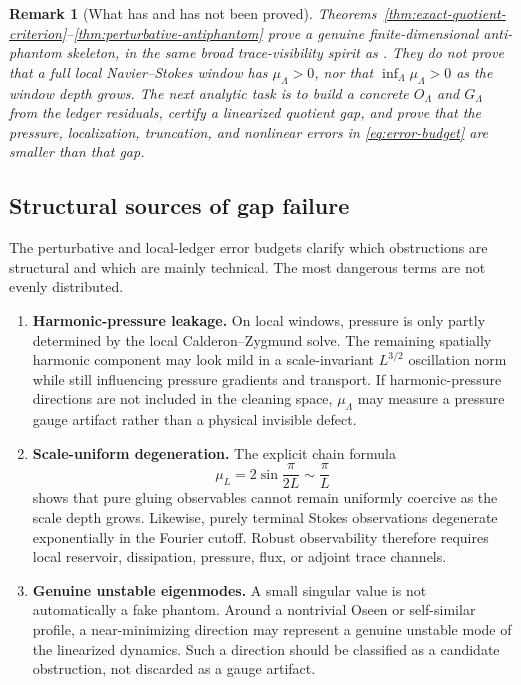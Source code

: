 \documentclass[11pt]{article}
\numberwithin{equation}{section}
\newtheorem{remark}[theorem]{Remark}
\begin{document}
\begin{remark}[What has and has not been proved]
Theorems~\ref{thm:exact-quotient-criterion}--\ref{thm:perturbative-antiphantom} prove a genuine finite-dimensional anti-phantom skeleton, in the same broad trace-visibility spirit as \cite{Yu2026SchurVisibility}.  They do not prove that a full local Navier--Stokes window has $\mu_\Lambda>0$, nor that $\inf_\Lambda\mu_\Lambda>0$ as the window depth grows.  The next analytic task is to build a concrete $O_\Lambda$ and $G_\Lambda$ from the ledger residuals, certify a linearized quotient gap, and prove that the pressure, localization, truncation, and nonlinear errors in \eqref{eq:error-budget} are smaller than that gap.
\end{remark}



\subsection{Structural sources of gap failure}\label{subsec:structural-gap-failure}

The perturbative and local-ledger error budgets clarify which obstructions are structural and which are mainly technical.  The most dangerous terms are not evenly distributed.

\begin{enumerate}[label=(\roman*),leftmargin=2em]
    \item \textbf{Harmonic-pressure leakage.}  On local windows, pressure is only partly determined by the local Calderon--Zygmund solve.  The remaining spatially harmonic component may look mild in a scale-invariant $L^{3/2}$ oscillation norm while still influencing pressure gradients and transport.  If harmonic-pressure directions are not included in the cleaning space, $\mu_\Lambda$ may measure a pressure gauge artifact rather than a physical invisible defect.

    \item \textbf{Scale-uniform degeneration.}  The explicit chain formula
    \[
        \mu_L=2\sin\frac{\pi}{2L}\sim\frac{\pi}{L}
    \]
    shows that pure gluing observables cannot remain uniformly coercive as the scale depth grows.  Likewise, purely terminal Stokes observations degenerate exponentially in the Fourier cutoff.  Robust observability therefore requires local reservoir, dissipation, pressure, flux, or adjoint trace channels.

    \item \textbf{Genuine unstable eigenmodes.}  A small singular value is not automatically a fake phantom.  Around a nontrivial Oseen or self-similar profile, a near-minimizing direction may represent a genuine unstable mode of the linearized dynamics.  Such a direction should be classified as a candidate obstruction, not discarded as a gauge artifact.
\end{enumerate}
\end{document}
